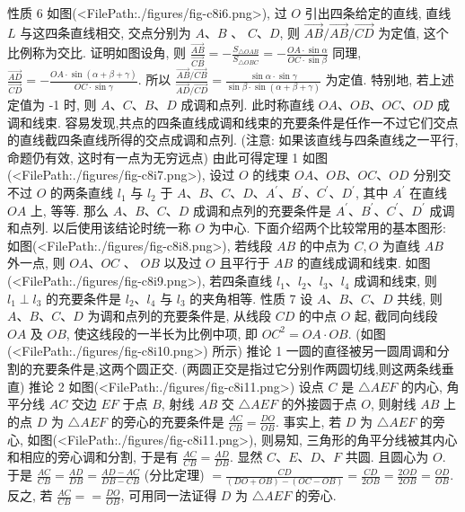 性质 6 如图(<FilePath:./figures/fig-c8i6.png>), 过 $O$ 引出四条给定的直线, 直线 $L$ 与这四条直线相交, 交点分别为 $A 、 B$ 、 $C 、 D$, 则 $\overrightarrow{A B} / \overrightarrow{A B} / \overrightarrow{C D}$ 为定值, 这个比例称为交比.
证明如图设角, 则 $\frac{\overrightarrow{A B}}{\overrightarrow{C B}}=-\frac{S_{\triangle O A B}}{S_{\triangle O B C}}= -\frac{O A \cdot \sin \alpha}{O C \cdot \sin \beta}$
同理, $\frac{\overrightarrow{A D}}{\overrightarrow{C D}}=-\frac{O A \cdot \sin (\alpha+\beta+\gamma)}{O C \cdot \sin \gamma}$.
所以 $\frac{\overrightarrow{A B} / \overrightarrow{C B}}{\overrightarrow{A D} / \overrightarrow{C D}}=\frac{\sin \alpha \cdot \sin \gamma}{\sin \beta \cdot \sin (\alpha+\beta+\gamma)}$ 为定值.
特别地, 若上述定值为 -1 时, 则 $A 、 C 、 B 、 D$ 成调和点列.
此时称直线 $O A 、 O B 、 O C 、 O D$ 成调和线束.
容易发现,共点的四条直线成调和线束的充要条件是任作一不过它们交点的直线截四条直线所得的交点成调和点列.
(注意: 如果该直线与四条直线之一平行, 命题仍有效, 这时有一点为无穷远点)
由此可得定理 1 如图(<FilePath:./figures/fig-c8i7.png>), 设过 $O$ 的线束 $O A 、 O B 、 O C 、 O D$ 分别交不过 $O$ 的两条直线 $l_1$ 与 $l_2$ 于 $A 、 B 、 C 、 D 、 A^{\prime} 、 B^{\prime} 、 C^{\prime} 、 D^{\prime}$, 其中 $A^{\prime}$ 在直线 $O A$ 上, 等等.
那么 $A 、 B 、 C 、 D$ 成调和点列的充要条件是 $A^{\prime} 、 B^{\prime} 、 C^{\prime} 、 D^{\prime}$ 成调和点列.
以后使用该结论时统一称 $O$ 为中心.
下面介绍两个比较常用的基本图形:
如图(<FilePath:./figures/fig-c8i8.png>), 若线段 $A B$ 的中点为 $C, O$ 为直线 $A B$ 外一点, 则 $O A 、 O C$ 、 $O B$ 以及过 $O$ 且平行于 $A B$ 的直线成调和线束.
如图(<FilePath:./figures/fig-c8i9.png>), 若四条直线 $l_1 、 l_2 、 l_3 、 l_4$ 成调和线束, 则 $l_1 \perp l_3$ 的充要条件是 $l_2 、 l_4$ 与 $l_3$ 的夹角相等.
性质 7 设 $A 、 B 、 C 、 D$ 共线, 则 $A 、 B 、 C 、 D$ 为调和点列的充要条件是, 从线段 $C D$ 的中点 $O$ 起, 截同向线段 $O A$ 及 $O B$, 使这线段的一半长为比例中项, 即 $O C^2=O A \cdot O B$. (如图(<FilePath:./figures/fig-c8i10.png>) 所示)
推论 1 一圆的直径被另一圆周调和分割的充要条件是,这两个圆正交.
(两圆正交是指过它分别作两圆切线,则这两条线垂直)
推论 2 如图(<FilePath:./figures/fig-c8i11.png>) 设点 $C$ 是 $\triangle A E F$ 的内心, 角平分线 $A C$ 交边 $E F$ 于点 $B$, 射线 $A B$ 交 $\triangle A E F$ 的外接圆于点 $O$, 则射线 $A B$ 上的点 $D$ 为 $\triangle A E F$ 的旁心的充要条件是 $\frac{A C}{C B}=\frac{D O}{O B}$.
事实上, 若 $D$ 为 $\triangle A E F$ 的旁心, 如图(<FilePath:./figures/fig-c8i11.png>), 则易知, 三角形的角平分线被其内心和相应的旁心调和分割, 于是有 $\frac{A C}{C B}=\frac{A D}{D B}$. 显然 $C 、 E 、 D 、 F$ 共圆.
且圆心为 $O$. 于是 $\frac{A C}{C B}=\frac{A D}{D B}=\frac{A D-A C}{D B-C B}$ (分比定理) $= \frac{C D}{(D O+O B)-(O C-O B)}=\frac{C D}{2 O B}=\frac{2 O D}{2 O B}=\frac{O D}{O B}$. 反之, 若 $\frac{A C}{C B}==\frac{D O}{O B}$, 可用同一法证得 $D$ 为 $\triangle A E F$ 的旁心.



